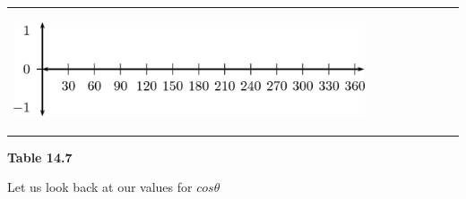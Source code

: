 \begin{center}
\begin{xtabular*}{\mytablewidth}[t]{|p{10\mystarwidth}|p{10\mystarwidth}|p{10\mystarwidth}|p{10\mystarwidth}|p{10\mystarwidth}|p{10\mystarwidth}|p{10\mystarwidth}|p{10\mystarwidth}|}
{\begin{center}
\label{m39414*id86866!!!underscore!!!media}\label{m39414*id86866!!!underscore!!!printimage}\includegraphics{col11306.imgs/m39414_MG10C15_023.png} %
\vspace{2pt}
\vspace{.1in}
\end{center}    
  }
\tabularnewline{}
\end{xtabular*}
\end{center}
\begin{center}{\small\bfseries Table 14.7}\end{center}
\par
\label{m39414*id86892}Let us look back at our values for $cos\theta $\par 
